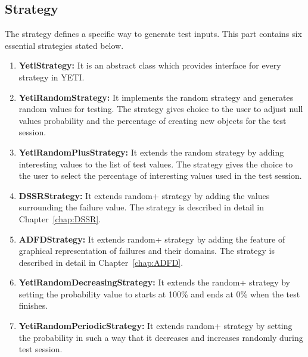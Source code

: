 \subsection{Strategy}
The strategy defines a specific way to generate test inputs. This part contains six essential strategies stated below.
\begin{enumerate}
\item {\textbf{YetiStrategy:}} It is an abstract class which provides interface for every strategy in YETI.
\item {\textbf{YetiRandomStrategy:}} It implements the random strategy and generates random values for testing. The strategy gives choice to the user to adjust null values probability and the percentage of creating new objects for the test session. 
\item {\textbf{YetiRandomPlusStrategy:}} It extends the random strategy by adding interesting values to the list of test values. The strategy gives the choice to the user to select the percentage of interesting values used in the test session.
\item {\textbf{DSSRStrategy:}} It extends random+ strategy by adding the values surrounding the failure value. The strategy is described in detail in Chapter~\ref{chap:DSSR}.
\item {\textbf{ADFDStrategy:}} It extends random+ strategy by adding the feature of graphical representation of failures and their domains. The strategy is described in detail in Chapter~\ref{chap:ADFD}.
\item {\textbf{YetiRandomDecreasingStrategy:}} It extends the random+ strategy by setting the probability value to starts at 100\% and ends at 0\% when the test finishes.
\item {\textbf{YetiRandomPeriodicStrategy:}} It extends random+ strategy by setting the probability in such a way that it decreases and increases randomly during test session.
\end{enumerate}

